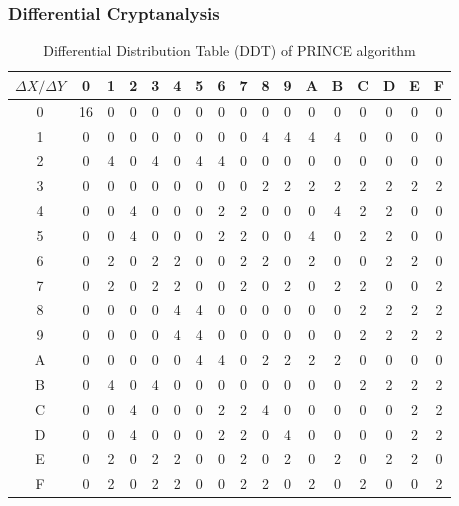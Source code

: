 \documentclass{beamer}
\begin{document}
\begin{frame}
\frametitle{Differential Cryptanalysis}


\begin{table}[h!]
\centering
\footnotesize
\begin{tabular}{|c|c|c|c|c|c|c|c|c|c|c|c|c|c|c|c|c|}
\hline
$\Delta X / \Delta Y $ & 0 & 1 & 2 & 3 & 4 & 5 & 6 & 7 & 8 & 9 & A & B & C & D & E & F \\
\hline
0 & 16 & 0 & 0 & 0 & 0 & 0 & 0 & 0 & 0 & 0 & 0 & 0 & 0 & 0 & 0 & 0 \\
\hline
1 & 0 & 0 & 0 & 0 & 0 & 0 & 0 & 0 & 4 & 4 & 4 & 4 & 0 & 0 & 0 & 0 \\
\hline
2 & 0 & 4 & 0 & 4 & 0 & 4 & 4 & 0 & 0 & 0 & 0 & 0 & 0 & 0 & 0 & 0 \\
\hline
3 & 0 & 0 & 0 & 0 & 0 & 0 & 0 & 0 & 2 & 2 & 2 & 2 & 2 & 2 & 2 & 2 \\
\hline
4 & 0 & 0 & 4 & 0 & 0 & 0 & 2 & 2 & 0 & 0 & 0 & 4 & 2 & 2 & 0 & 0 \\
\hline
5 & 0 & 0 & 4 & 0 & 0 & 0 & 2 & 2 & 0 & 0 & 4 & 0 & 2 & 2 & 0 & 0 \\
\hline
6 & 0 & 2 & 0 & 2 & 2 & 0 & 0 & 2 & 2 & 0 & 2 & 0 & 0 & 2 & 2 & 0 \\
\hline
7 & 0 & 2 & 0 & 2 & 2 & 0 & 0 & 2 & 0 & 2 & 0 & 2 & 2 & 0 & 0 & 2 \\
\hline
8 & 0 & 0 & 0 & 0 & 4 & 4 & 0 & 0 & 0 & 0 & 0 & 0 & 2 & 2 & 2 & 2 \\
\hline
9 & 0 & 0 & 0 & 0 & 4 & 4 & 0 & 0 & 0 & 0 & 0 & 0 & 2 & 2 & 2 & 2 \\
\hline
A & 0 & 0 & 0 & 0 & 0 & 4 & 4 & 0 & 2 & 2 & 2 & 2 & 0 & 0 & 0 & 0 \\
\hline
B & 0 & 4 & 0 & 4 & 0 & 0 & 0 & 0 & 0 & 0 & 0 & 0 & 2 & 2 & 2 & 2 \\
\hline
C & 0 & 0 & 4 & 0 & 0 & 0 & 2 & 2 & 4 & 0 & 0 & 0 & 0 & 0 & 2 & 2 \\
\hline
D & 0 & 0 & 4 & 0 & 0 & 0 & 2 & 2 & 0 & 4 & 0 & 0 & 0 & 0 & 2 & 2 \\
\hline
E & 0 & 2 & 0 & 2 & 2 & 0 & 0 & 2 & 0 & 2 & 0 & 2 & 0 & 2 & 2 & 0 \\
\hline
F & 0 & 2 & 0 & 2 & 2 & 0 & 0 & 2 & 2 & 0 & 2 & 0 & 2 & 0 & 0 & 2 \\
\hline
\end{tabular}
\caption{Differential Distribution Table (DDT) of PRINCE algorithm}
\label{tbl:ddtprince}
\end{table} 
    
\end{frame}
\end{document}
